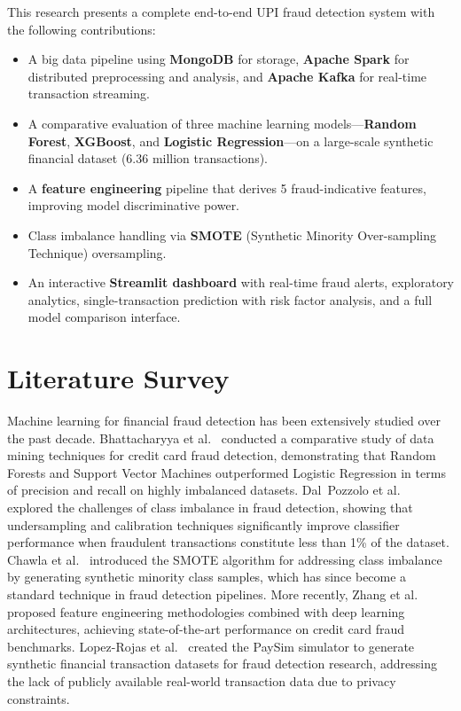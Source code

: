 \documentclass[conference]{IEEEtran}
\begin{document}
This research presents a complete end-to-end UPI fraud detection system with the following contributions:
\begin{itemize}
    \item A big data pipeline using \textbf{MongoDB} for storage, \textbf{Apache Spark} for distributed preprocessing and analysis, and \textbf{Apache Kafka} for real-time transaction streaming.
    \item A comparative evaluation of three machine learning models---\textbf{Random Forest}, \textbf{XGBoost}, and \textbf{Logistic Regression}---on a large-scale synthetic financial dataset (6.36 million transactions).
    \item A \textbf{feature engineering} pipeline that derives 5 fraud-indicative features, improving model discriminative power.
    \item Class imbalance handling via \textbf{SMOTE} (Synthetic Minority Over-sampling Technique) oversampling.
    \item An interactive \textbf{Streamlit dashboard} with real-time fraud alerts, exploratory analytics, single-transaction prediction with risk factor analysis, and a full model comparison interface.
\end{itemize}

\section{Literature Survey}
Machine learning for financial fraud detection has been extensively studied over the past decade. Bhattacharyya et al.~\cite{bhattacharyya2011} conducted a comparative study of data mining techniques for credit card fraud detection, demonstrating that Random Forests and Support Vector Machines outperformed Logistic Regression in terms of precision and recall on highly imbalanced datasets. Dal~Pozzolo et al.~\cite{dalpozzolo2015} explored the challenges of class imbalance in fraud detection, showing that undersampling and calibration techniques significantly improve classifier performance when fraudulent transactions constitute less than 1\% of the dataset. Chawla et al.~\cite{chawla2002} introduced the SMOTE algorithm for addressing class imbalance by generating synthetic minority class samples, which has since become a standard technique in fraud detection pipelines. More recently, Zhang et al.~\cite{zhang2021} proposed feature engineering methodologies combined with deep learning architectures, achieving state-of-the-art performance on credit card fraud benchmarks. Lopez-Rojas et al.~\cite{lopezrojas2016} created the PaySim simulator to generate synthetic financial transaction datasets for fraud detection research, addressing the lack of publicly available real-world transaction data due to privacy constraints.
\end{document}
